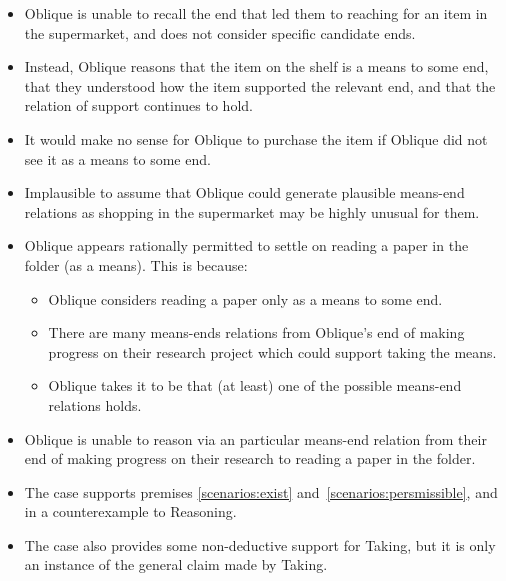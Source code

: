\documentclass[10pt]{article}
\newcommand{\hozlinedash}[0]{%
  \noindent\hdashrule[0.5ex][c]{\textwidth}{.1pt}{2.5pt}
}
\newcommand{\schemaName}[1]{\textsf{#1}}
\begin{document}
\begin{itemize}
\item Oblique is unable to recall the end that led them to reaching for an item in the supermarket, and does not consider specific candidate ends.
\item Instead, Oblique reasons that the item on the shelf is a means to some end, that they understood how the item supported the relevant end, and that the relation of support continues to hold.
\item It would make no sense for Oblique to purchase the item if Oblique did not see it as a means to some end.
\item Implausible to assume that Oblique could generate plausible means-end relations as shopping in the supermarket may be highly unusual for them.
\end{itemize}




\hozlinedash

\begin{itemize}
\item Oblique appears rationally permitted to settle on reading a paper in the folder (as a means).
  This is because:
  \begin{itemize}
  \item Oblique considers reading a paper only as a means to some end.
  \item There are many means-ends relations from Oblique's end of making progress on their research project which could support taking the means.
  \item Oblique takes it to be that (at least) one of the possible means-end relations holds.
  \end{itemize}
\item Oblique is unable to reason via an particular means-end relation from their end of making progress on their research to reading a paper in the folder.
\end{itemize}


\begin{itemize}
\item The case supports premises \ref{scenarios:exist} and~\ref{scenarios:persmissible}, and in a counterexample to \schemaName{Reasoning}.
\item The case also provides some non-deductive support for \schemaName{Taking}, but it is only an instance of the general claim made by \schemaName{Taking}.
\end{itemize}


\newpage
\end{document}
